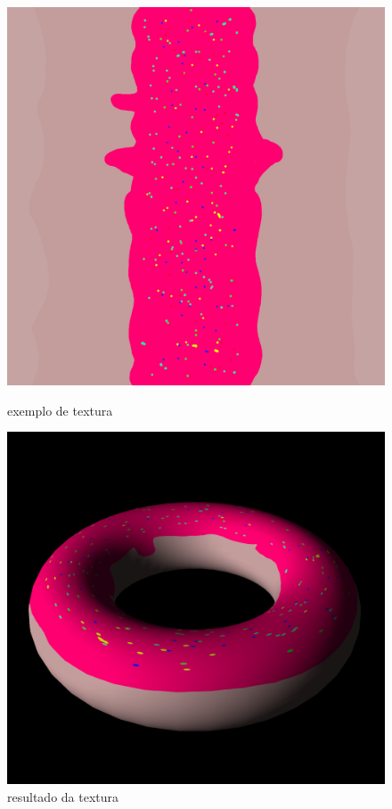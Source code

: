 \documentclass[a4paper]{report}
\begin{document}


\begin{figure}[H]
    \centering
    \begin{minipage}{0.40\textwidth}
        \centering
        \includegraphics[width=\textwidth]{images/donut.jpg}
        \caption{exemplo de textura}
    \end{minipage}\hfill
    \begin{minipage}{0.59\textwidth}
        \centering
        \includegraphics[width=\textwidth]{images/donut_rendered.png}
        \caption{resultado da textura}
    \end{minipage}\hfill
\end{figure}
\end{document}

